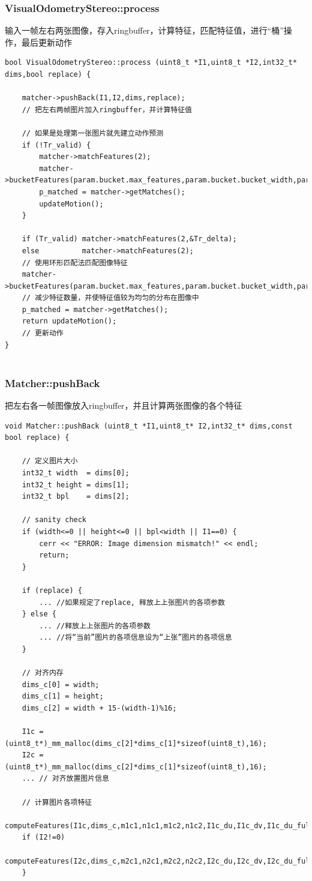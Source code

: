 \documentclass[UTF8]{ctexart}
\begin{document}
    \subsubsection{VisualOdometryStereo::process}
    输入一帧左右两张图像，存入ringbuffer，计算特征，匹配特征值，进行“桶”操作，最后更新动作
    \begin{verbatim}
bool VisualOdometryStereo::process (uint8_t *I1,uint8_t *I2,int32_t* dims,bool replace) {

    matcher->pushBack(I1,I2,dims,replace);
    // 把左右两帧图片加入ringbuffer，并计算特征值
    
    // 如果是处理第一张图片就先建立动作预测
    if (!Tr_valid) {
        matcher->matchFeatures(2);
        matcher->bucketFeatures(param.bucket.max_features,param.bucket.bucket_width,param.bucket.bucket_height);                          
        p_matched = matcher->getMatches();
        updateMotion();
    }
    
    if (Tr_valid) matcher->matchFeatures(2,&Tr_delta);
    else          matcher->matchFeatures(2);
    // 使用环形匹配法匹配图像特征
    matcher->bucketFeatures(param.bucket.max_features,param.bucket.bucket_width,param.bucket.bucket_height);                          
    // 减少特征数量，并使特征值较为均匀的分布在图像中
    p_matched = matcher->getMatches();
    return updateMotion();
    // 更新动作
}
        
    \end{verbatim}
    \subsubsection{Matcher::pushBack} 
        把左右各一帧图像放入ringbuffer，并且计算两张图像的各个特征
    \begin{verbatim}
void Matcher::pushBack (uint8_t *I1,uint8_t* I2,int32_t* dims,const bool replace) {
    
    // 定义图片大小
    int32_t width  = dims[0];
    int32_t height = dims[1];
    int32_t bpl    = dims[2];

    // sanity check
    if (width<=0 || height<=0 || bpl<width || I1==0) {
        cerr << "ERROR: Image dimension mismatch!" << endl;
        return;
    }

    if (replace) {
        ... //如果规定了replace, 释放上上张图片的各项参数
    } else {
        ... //释放上上张图片的各项参数
        ... //将“当前”图片的各项信息设为“上张”图片的各项信息
    }

    // 对齐内存
    dims_c[0] = width;
    dims_c[1] = height;
    dims_c[2] = width + 15-(width-1)%16;

    I1c = (uint8_t*)_mm_malloc(dims_c[2]*dims_c[1]*sizeof(uint8_t),16);
    I2c = (uint8_t*)_mm_malloc(dims_c[2]*dims_c[1]*sizeof(uint8_t),16);
    ... // 对齐放置图片信息

    // 计算图片各项特征
    computeFeatures(I1c,dims_c,m1c1,n1c1,m1c2,n1c2,I1c_du,I1c_dv,I1c_du_full,I1c_dv_full);
    if (I2!=0)
        computeFeatures(I2c,dims_c,m2c1,n2c1,m2c2,n2c2,I2c_du,I2c_dv,I2c_du_full,I2c_dv_full);
    }
    \end{verbatim}
\end{document}

